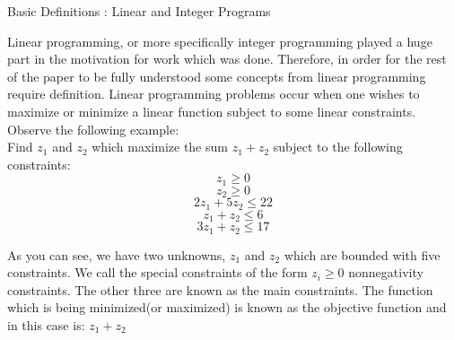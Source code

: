\documentclass[11pt]{report}
\begin{document}
\begin{Large}
Basic Definitions : Linear and Integer Programs \\
\end{Large}

Linear programming, or more specifically integer programming played a huge part in the motivation for work which was done. Therefore, in order for the rest of the paper to be fully understood some concepts from linear programming require definition. Linear programming problems occur when one wishes to maximize or minimize a linear function subject to some linear constraints. Observe the following example:\\

Find $z_1$ and $z_2$ which maximize the sum $z_1 + z_2$ subject to the following constraints:
$$z_1 \geq 0$$
$$z_2 \geq 0$$
$$2z_1 + 5z_2 \leq 22 $$
$$z_1 + z_2 \leq 6$$ 
$$3z_1 + z_2 \leq 17$$

As you can see, we have two unknowns, $z_1$ and $z_2$ which are bounded with five constraints. We call the special constraints of the form $z_i \geq 0$ nonnegativity constraints. The other three are known as the main constraints.  The function which is being minimized(or maximized) is known as the objective function and in this case is: $z_1 + z_2$
\end{document}
